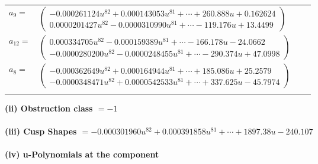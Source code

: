 \documentclass[1p]{elsarticle_modified}
\theoremstyle{definition}
\begin{document}
\begin{tabular}{m{7pt} m{180pt} m{7pt} m{180pt} }
\flushright $a_{9}=$&$\begin{pmatrix}-0.000261124 u^{82}+0.000143053 u^{81}+\cdots+260.888 u+0.162624\\0.0000201427 u^{82}-0.0000310990 u^{81}+\cdots-119.176 u+13.4499\end{pmatrix}$ \\
\flushright $a_{12}=$&$\begin{pmatrix}0.000334705 u^{82}-0.000159389 u^{81}+\cdots-166.178 u-24.0662\\-0.0000280200 u^{82}-0.0000248455 u^{81}+\cdots-290.374 u+47.0998\end{pmatrix}$ \\
\flushright $a_{8}=$&$\begin{pmatrix}-0.000362649 u^{82}+0.000164944 u^{81}+\cdots+185.086 u+25.2579\\-0.0000348471 u^{82}+0.0000542533 u^{81}+\cdots+337.625 u-45.7974\end{pmatrix}$\\&\end{tabular}
\flushleft \textbf{(ii) Obstruction class $= -1$}\\~\\
\flushleft \textbf{(iii) Cusp Shapes $= -0.000301960 u^{82}+0.000391858 u^{81}+\cdots+1897.38 u-240.107$}\\~\\
\newpage\renewcommand{\arraystretch}{1}
\flushleft \textbf{(iv) u-Polynomials at the component}\newline \\
\end{document}
